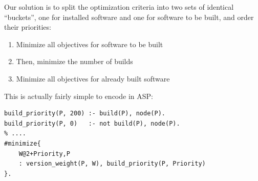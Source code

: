 

Our solution is to split the optimization criteria into two sets of identical
``buckets'', one for installed software and one for software to be built,
and order their priorities:
\begin{enumerate}
\item Minimize all objectives for software to be built
\item Then, minimize the number of builds
\item Minimize all objectives for already built software
\end{enumerate}

\noindent
This is actually fairly simple to encode in ASP:

\begin{verbatim}
build_priority(P, 200) :- build(P), node(P).
build_priority(P, 0)   :- not build(P), node(P).
% ....
#minimize{
    W@2+Priority,P
    : version_weight(P, W), build_priority(P, Priority)
}.
\end{verbatim}

